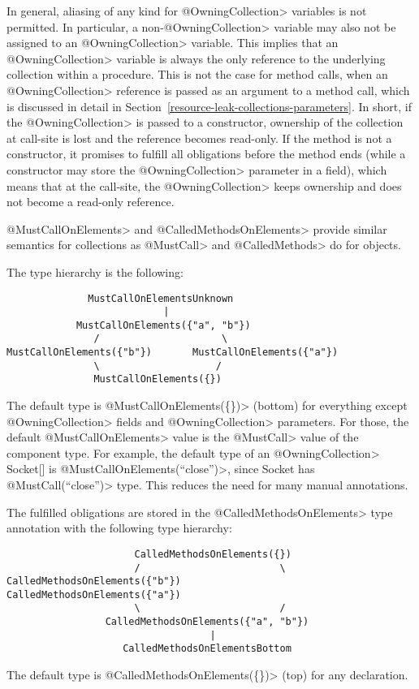 In general, aliasing of any kind for \<@OwningCollection> variables is not permitted. In particular, a non-\<@OwningCollection> variable may also not be assigned to an \<@OwningCollection> variable. This implies that an \<@OwningCollection> variable is always the only reference to the underlying collection within a procedure. This is not the case for method calls, when an \<@OwningCollection> reference is passed as an argument to a method call, which is discussed in detail in Section~\ref{resource-leak-collections-parameters}. In short, if the \<@OwningCollection> is passed to a constructor, ownership of the collection at call-site is lost and the reference becomes read-only.
\noindent If the method is not a constructor, it promises to fulfill all obligations before the method ends (while a constructor may store the \<@OwningCollection> parameter in a field), which means that at the call-site, the \<@OwningCollection> keeps ownership and does not become a read-only reference.

\<@MustCallOnElements> and \<@CalledMethodsOnElements> provide similar semantics for collections as \<@MustCall> and \<@CalledMethods> do for objects.

The type hierarchy is the following:

\begin{verbatim}
              MustCallOnElementsUnknown
                           |
            MustCallOnElements({"a", "b"})
               /                     \
MustCallOnElements({"b"})       MustCallOnElements({"a"})
               \                    /
               MustCallOnElements({})
\end{verbatim}
The default type is \<@MustCallOnElements(\{\})> (bottom) for everything except \<@OwningCollection> fields and \<@OwningCollection> parameters. For those, the default \<@MustCallOnElements> value is the \<@MustCall> value of the component type. For example, the default type of an \<@OwningCollection> Socket[] is \<@MustCallOnElements({``close''})>, since Socket has \<@MustCall(``close'')> type. This reduces the need for many manual annotations.

The fulfilled obligations are stored in the \<@CalledMethodsOnElements> type annotation with the following type hierarchy:
\begin{verbatim}
                      CalledMethodsOnElements({})
                      /                        \
CalledMethodsOnElements({"b"})           CalledMethodsOnElements({"a"})
                      \                        /
                 CalledMethodsOnElements({"a", "b"})
                                   |
                    CalledMethodsOnElementsBottom
\end{verbatim}
The default type is \<@CalledMethodsOnElements(\{\})> (top) for any declaration.



